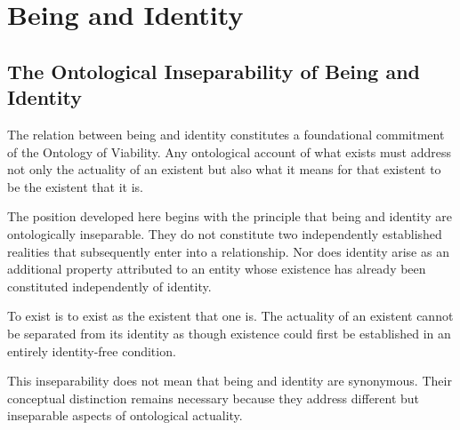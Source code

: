 %
%
%
%


\section{Being and Identity}
\label{sec:being-and-identity}



\subsection{The Ontological Inseparability of Being and Identity}

The relation between being and identity constitutes
a foundational commitment of the Ontology of Viability.
Any ontological account of what exists must address
not only the actuality of an existent but also what
it means for that existent to be the existent that it is.

The position developed here begins with the principle
that being and identity are ontologically inseparable.
They do not constitute two independently established
realities that subsequently enter into a relationship.
Nor does identity arise as an additional property
attributed to an entity whose existence has already
been constituted independently of identity.

To exist is to exist as the existent that one is.
The actuality of an existent cannot be separated
from its identity as though existence could first
be established in an entirely identity-free condition.

This inseparability does not mean that being and
identity are synonymous. Their conceptual distinction
remains necessary because they address different
but inseparable aspects of ontological actuality.

